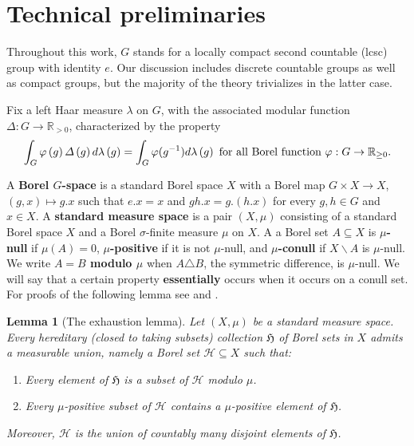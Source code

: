 \documentclass{amsart}
\numberwithin{equation}{subsection}
\newtheorem{lem}[thm]{Lemma}
\begin{document}
\section{Technical preliminaries}

Throughout this work, \(G\) stands for a locally compact second countable (lcsc) group with identity \(e\). Our discussion includes discrete countable groups as well as compact groups, but the majority of the theory trivializes in the latter case.

Fix a left Haar measure \(\lambda\) on \(G\), with the associated modular function \(\varDelta:G\to\mathbb{R}_{>0}\), characterized by the property
\[\int_{G}\varphi\left(g\right)\varDelta\left(g\right)d\lambda\left(g\right)=\int_{G}\varphi\small(g^{-1}\small)d\lambda\left(g\right)\text{ for all Borel function }\varphi:G\to\mathbb{R}_{\geq 0}.\]

A {\bf Borel \(G\)-space} is a standard Borel space \(X\) with a Borel map \(G\times X\to X\), \(\left(g,x\right)\mapsto g.x\) such that \(e.x=x\) and \(gh.x=g.\left(h.x\right)\) for every \(g,h\in G\) and \(x\in X\). A {\bf standard measure space} is a pair \(\left(X,\mu\right)\) consisting of a standard Borel space \(X\) and a Borel \(\sigma\)-finite measure \(\mu\) on \(X\). A a Borel set \(A\subseteq X\) is {\bf \(\mu\)-null} if \(\mu\left(A\right)=0\), {\bf \(\mu\)-positive} if it is not \(\mu\)-null, and {\bf \(\mu\)-conull} if \(X\backslash A\) is \(\mu\)-null. We write {\bf \(A=B\) modulo \(\mu\)} when \(A\triangle B\), the symmetric difference, is \(\mu\)-null. We will say that a certain property {\bf essentially} occurs when it occurs on a conull set. For proofs of the following lemma see \cite[p. 17]{krengel1985ergodic} and \cite[Lemma 1.0.7]{aaronson1997introduction}.

\begin{lem}[The exhaustion lemma]
\label{lem:exhaust}
Let \(\left(X,\mu\right)\) be a standard measure space. Every \emph{hereditary} (closed to taking subsets) collection \(\mathfrak{H}\) of Borel sets in \(X\) admits a \emph{measurable union}, namely a Borel set \(\mathcal{H}\subseteq X\) such that:
\begin{enumerate}
    \item Every element of \(\mathfrak{H}\) is a subset of \(\mathcal{H}\) modulo \(\mu\).
    \item Every \(\mu\)-positive subset of \(\mathcal{H}\) contains a \(\mu\)-positive element of \(\mathfrak{H}\).
\end{enumerate}
Moreover, \(\mathcal{H}\) is the union of countably many disjoint elements of \(\mathfrak{H}\).
\end{lem}
\end{document}

